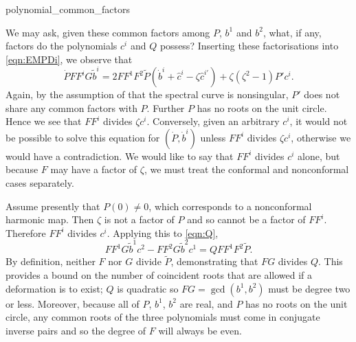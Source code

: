 \documentclass{article}
\begin{document}
{polynomial_common_factors}

We may ask, given these common factors among $P$, $b^1$ and $b^2$, what, if any, factors do the polynomials $c^i$ and $Q$ possess? Inserting these factorisations into \eqref{eqn:EMPDi}, we observe that
\[
\dot{P} F F^i G \tilde{b}^i = 2 F F^1 F^2 \tilde{P} (\dot{b}^i + \hat{c}^i - \zeta\hat{c}^{i\prime}) + \zeta(\zeta^2-1 ) P'c^i.
\]
Again, by the assumption of that the spectral curve is nonsingular, $P'$ does not share any common factors with $P$. Further $P$ has no roots on the unit circle. Hence we see that $FF^i$ divides $\zeta c^i$. Conversely, given an arbitrary $c^i$, it would not be possible to solve this equation for $(\dot{P},\dot{b}^i)$ unless $FF^i$ divides $\zeta c^i$, otherwise we would have a contradiction. We would like to say that $FF^i$ divides $c^i$ alone, but because $F$ may have a factor of $\zeta$, we must treat the conformal and nonconformal cases separately.

Assume presently that $P(0)\neq 0$, which corresponds to a nonconformal harmonic map. Then $\zeta$ is not a factor of $P$ and so cannot be a factor of $FF^i$. Therefore $FF^i$ divides $c^i$. Applying this to \eqref{eqn:Q},
\[
FF^1G\tilde{b}^1 c^2 - FF^2G\tilde{b}^2 c^1 = Q FF^1F^2\tilde{P}.
\]
By definition, neither $F$ nor $G$ divide $\tilde{P}$, demonstrating that $FG$ divides $Q$. This provides a bound on the number of coincident roots that are allowed if a deformation is to exist; $Q$ is quadratic so $FG = \gcd(b^1,b^2)$ must be degree two or less. Moreover, because all of $P$, $b^1$, $b^2$ are real, and $P$ has no roots on the unit circle, any common roots of the three polynomials must come in conjugate inverse pairs and so the degree of $F$ will always be even.
\end{document}
